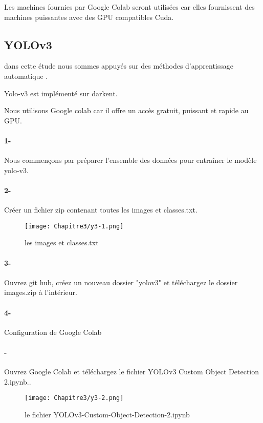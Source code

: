      Les machines fournies par Google Colab seront utilisées car elles fournissent des machines puissantes avec des GPU compatibles Cuda.
     
     \subsection{YOLOv3}
     dans cette étude nous sommes appuyés sur  des méthodes d'apprentissage automatique .
     
     Yolo-v3 est implémenté sur darkent.
      
     Nous utilisons Google colab car il offre un accès gratuit, puissant et rapide au GPU.
     
      \paragraph{1-} Nous commençons par préparer l'ensemble des données pour entraîner le modèle yolo-v3. 
      \paragraph{2-} Créer un fichier zip contenant toutes les images et classes.txt.
      \begin{figure}[H]
           \centering
           \texttt{[image: Chapitre3/y3-1.png]}
           \caption{les images et classes.txt}
           \label{y3-1}
           \end{figure}  
                    
      
      \paragraph{3-} Ouvrez git hub, créez un nouveau dossier "yolov3" et téléchargez le dossier images.zip à l'intérieur.
      \paragraph{4-} Configuration de Google Colab
      \paragraph{-} Ouvrez Google Colab et téléchargez le fichier YOLOv3 Custom Object Detection 2.ipynb.\cite{yolo_collab}.
      \begin{figure}[H]
           \centering
           \texttt{[image: Chapitre3/y3-2.png]}
           \caption{le fichier YOLOv3-Custom-Object-Detection-2.ipynb}
           \label{y3-2}
           \end{figure}  

